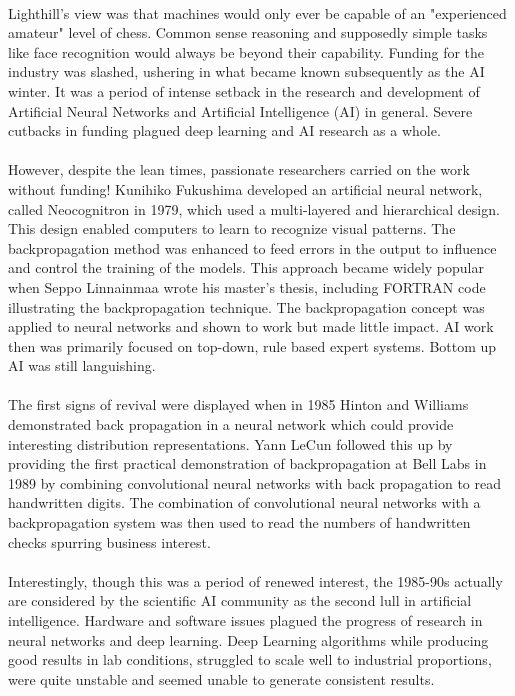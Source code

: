 \documentclass[12pt,a4paper]{article}
\begin{document}
\paragraph{}
Lighthill’s view was that machines would only ever be capable of an "experienced amateur" level of chess. Common sense reasoning and supposedly simple tasks like face recognition would always be beyond their capability. Funding for the industry was slashed, ushering in what became known subsequently as the AI winter. It was a period of intense setback in the research and development of Artificial Neural Networks and Artificial Intelligence (AI) in general. Severe cutbacks in funding plagued deep learning and AI research as a whole. 
\paragraph{}
However, despite the lean times, passionate researchers carried on the work without funding! Kunihiko Fukushima developed an artificial neural network, called Neocognitron in 1979, which used a multi-layered and hierarchical design. This design enabled computers to learn to recognize visual patterns. The backpropagation method was enhanced to feed errors in the output to influence and control the training of the models. This approach became widely popular when Seppo Linnainmaa wrote his master’s thesis, including FORTRAN code illustrating the backpropagation technique. The backpropagation concept was applied to neural networks and shown to work but made little impact. AI work then was primarily focused on top-down, rule based expert systems. Bottom up AI was still languishing. 
\paragraph{}
The first signs of revival were displayed when in 1985 Hinton and Williams demonstrated back propagation in a neural network which could provide interesting distribution representations. Yann LeCun followed this up by providing the first practical demonstration of backpropagation at Bell Labs in 1989 by combining convolutional neural networks with back propagation to read handwritten digits. The combination of convolutional neural networks with a backpropagation system was then used to read the numbers of handwritten checks spurring business interest. 
\paragraph{}
Interestingly, though this was a period of renewed interest, the 1985-90s actually are considered by the scientific AI community as the second lull in artificial intelligence. Hardware and software issues plagued the progress of research in neural networks and deep learning. Deep Learning algorithms while producing good results in lab conditions, struggled to scale well to industrial proportions, were quite unstable and seemed unable to generate consistent results. 
\end{document}
